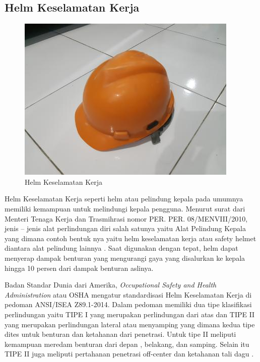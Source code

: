 

\subsection{Helm Keselamatan Kerja}
\label{subsec:helmkeselamatankerja}

\begin{figure}[ht]
    \centering
    \includegraphics[scale=0.7]{gambar/safety_helmet.jpg}
    \caption{Helm Keselamatan Kerja}
    \label{fig:helmkeselamatankerja}  
  \end{figure}

Helm Keselamatan Kerja seperti helm atau pelindung kepala pada umumnya memiliki kemampuan untuk 
melindungi kepala pengguna. Menurut surat dari Menteri Tenaga Kerja dan Trasmihrasi nomor PER. PER. 08/MENVIII/2010, 
jenis – jenis alat perlindungan diri salah satunya yaitu Alat Pelindung Kepala yang dimana contoh bentuk
nya yaitu helm keselamatan kerja atau safety helmet diantara alat pelindung lainnya \cite{suratkementriantenagakerja}. 
Saat digunakan dengan tepat, helm dapat menyerap dampak benturan yang mengurangi gaya yang disalurkan ke kepala hingga 10 persen dari dampak benturan aslinya. \cite{kim2018safety}

Badan Standar Dunia dari Amerika, \emph{Occupational Safety and Health Administration} atau OSHA mengatur 
standardisasi Helm Keselamatan Kerja di pedoman ANSI/ISEA Z89.1-2014. Dalam pedoman memiliki dua tipe 
klasifikasi perlindungan yaitu TIPE I yang merupakan perlindungan dari atas dan TIPE II yang merupakan 
perlindungan lateral atau menyamping yang dimana kedua tipe dites untuk benturan dan ketahanan dari 
penetrasi. Untuk tipe II meliputi kemampuan meredam benturan dari depan , belakang, dan samping. 
Selain itu TIPE II juga meliputi pertahanan penetrasi off-center dan ketahanan tali dagu \cite{american1997american}.

